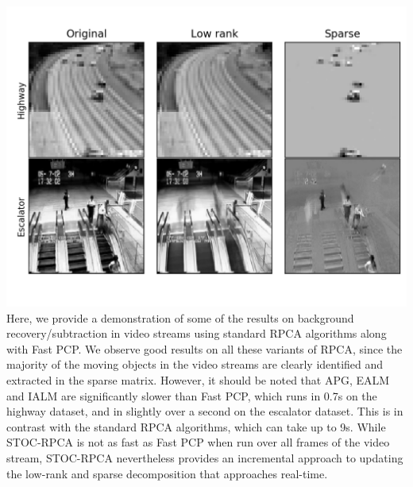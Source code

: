 \documentclass[oneside]{article}
\begin{document}
\includegraphics[scale= 0.5]{montage_fpcp.png}\newline
Here, we provide a demonstration of some of the results on background recovery/subtraction in video streams using standard RPCA algorithms along with Fast PCP. We observe good results on all these variants of RPCA, since the majority of the moving objects in the video streams are clearly identified and extracted in the sparse matrix. However, it should be noted that APG, EALM and IALM are significantly slower than Fast PCP, which runs in 0.7s on the highway dataset, and in slightly over a second on the escalator dataset. This is in contrast with the standard RPCA algorithms, which can take up to 9s. While STOC-RPCA is not as fast as Fast PCP when run over all frames of the video stream, STOC-RPCA nevertheless provides an incremental approach to updating the low-rank and sparse decomposition that approaches real-time.
\end{document}

